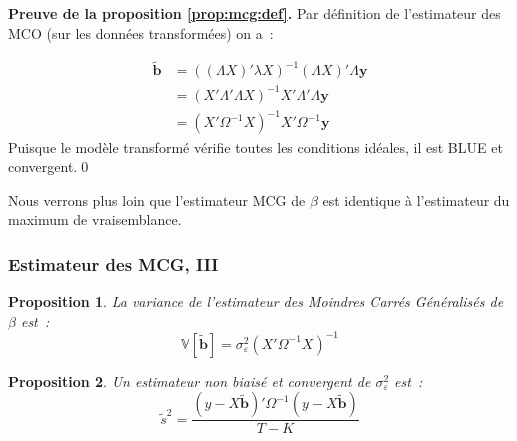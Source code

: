 \documentclass[10pt]{beamer}
\theoremstyle{plain}
\newtheorem{prop}{Proposition}
\begin{document}
\begin{notes}

  \textbf{Preuve de la proposition \ref{prop:mcg:def}.} Par définition de l'estimateur des MCO (sur les données transformées) on a~:

  \[
    \begin{split}
      \tilde{\textbf{b}} &= \left( (\Lambda X)'\lambda X\right)^{-1}(\Lambda X)'\Lambda \mathbf y\\
                         &= \left( X'\Lambda' \Lambda X \right)^{-1}X'\Lambda'\Lambda \mathbf y\\
                         &= \left( X'\Omega^{-1}X \right)^{-1}X'\Omega^{-1}\mathbf y
    \end{split}
  \]
  Puisque le modèle transformé vérifie toutes les conditions idéales, il est BLUE et convergent.\qed

  \bigskip

  Nous verrons plus loin que l'estimateur MCG de $\beta$ est identique à l'estimateur du maximum de vraisemblance.

\end{notes}


\begin{frame}
  \frametitle{Estimateur des MCG, III}


  \begin{prop}\label{prop:mcg:variance}
    La variance de l'estimateur des Moindres Carrés Généralisés de $\beta$ est~:
    \[
      \mathbb V \left[\tilde{\textbf{b}}\right] = \sigma_{\varepsilon}^2(X'\Omega^{-1}X)^{-1}
    \]
  \end{prop}

  \bigskip

  \begin{prop}\label{prop:mcg:s2}
    Un estimateur non biaisé et convergent de $\sigma_{\varepsilon}^2$ est~:
    \[
      \tilde s^2 = \frac{\left(y-X\tilde{\textbf{b}}\right)'\Omega^{-1}\left(y-X\tilde{\textbf{b}}\right)}{T-K}
    \]
  \end{prop}

\end{frame}
\end{document}
